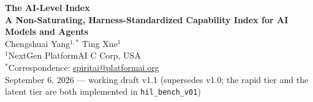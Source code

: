 \documentclass[11pt]{article}
\theoremstyle{definition}
\begin{document}
\begin{center}
{\LARGE\bfseries The AI-Level Index}\\[6pt]
{\large\bfseries A Non-Saturating, Harness-Standardized Capability Index for AI Models and Agents}\\[14pt]
{\large Chengshuai Yang$^{1,*}$ \quad Ting Xue$^{1}$}\\[5pt]
{\normalsize $^{1}$NextGen PlatformAI C Corp, USA}\\[4pt]
{\normalsize $^{*}$Correspondence: \href{mailto:spiritai@platformai.org}{spiritai@platformai.org}}\\[10pt]
{\small September 6, 2026 --- working draft v1.1 (supersedes v1.0; the rapid tier and the latent tier are both implemented in \texttt{hil\_bench\_v01})}
\end{center}
\end{document}
